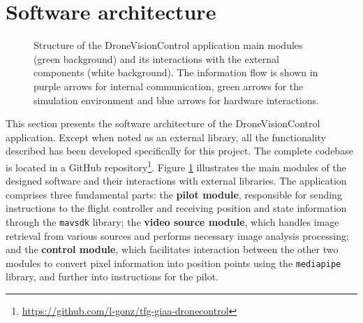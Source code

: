 \section{Software architecture}

\begin{figure}
  \centering
  \caption{Structure of the DroneVisionControl application main modules (green background) and its interactions with the external components (white background). The information flow is shown in purple arrows for internal communication, green arrows for the simulation environment and blue arrows for hardware interactions.}
\label{fig:soft-arch}
\end{figure}

This section presents the software architecture of the DroneVisionControl application. Except when noted as an external library, all the functionality described has been developed specifically for this project. The complete codebase is located in a GitHub repository\footnote{\url{https://github.com/l-gonz/tfg-giaa-dronecontrol}}.
Figure \ref{fig:soft-arch} illustrates the main modules of the designed software and their interactions with external libraries. The application comprises three fundamental parts: the \textbf{pilot module}, responsible for sending instructions to the flight controller and receiving position and state information through the \texttt{mavsdk} library; the \textbf{video source module}, which handles image retrieval from various sources and performs necessary image analysis processing; and the \textbf{control module}, which facilitates interaction between the other two modules to convert pixel information into position points using the \texttt{mediapipe} library, and further into instructions for the pilot.


